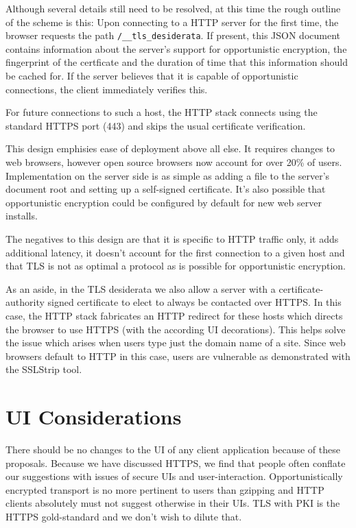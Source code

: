 \documentclass[conference]{IEEEtran}
\begin{document}
Although several details still need to be resolved, at this time the rough
outline of the scheme is this: Upon connecting to a HTTP server for the first
time, the browser requests the path {\tt /\_\_tls\_desiderata}. If present,
this JSON\cite{rfc4627} document contains information about the server's support for
opportunistic encryption, the fingerprint of the certficate and the duration of
time that this information should be cached for. If the server believes that it
is capable of opportunistic connections, the client immediately verifies this.

For future connections to such a host, the HTTP stack connects using the
standard HTTPS port (443) and skips the usual certificate verification.

This design emphisies ease of deployment above all else. It requires changes to
web browsers, however open source browsers now account for over 20\% of
users\cite{netapp}. Implementation on the server side is as simple as adding a file to
the server's document root and setting up a self-signed certificate. It's also
possible that opportunistic encryption could be configured by default for new
web server installs.

The negatives to this design are that it is specific to HTTP traffic only, it
adds additional latency, it doesn't account for the first connection to a given
host and that TLS is not as optimal a protocol as is possible for opportunistic
encryption.

As an aside, in the TLS desiderata we also allow a server with a
certificate-authority signed certificate to elect to always be contacted over
HTTPS. In this case, the HTTP stack fabricates an HTTP redirect for these hosts
which directs the browser to use HTTPS (with the according UI decorations).
This helps solve the issue which arises when users type just the domain name of
a site. Since web browsers default to HTTP in this case, users are vulnerable
as demonstrated with the SSLStrip tool\cite{sslstrip}.

\section{UI Considerations}

There should be no changes to the UI of any client application because of these
proposals. Because we have discussed HTTPS, we find that people often conflate
our suggestions with issues of secure UIs and user-interaction.
Opportunistically encrypted transport is no more pertinent to users than
gzipping and HTTP clients absolutely must not suggest otherwise in their UIs.
TLS with PKI is the HTTPS gold-standard and we don't wish to dilute that.
\end{document}
